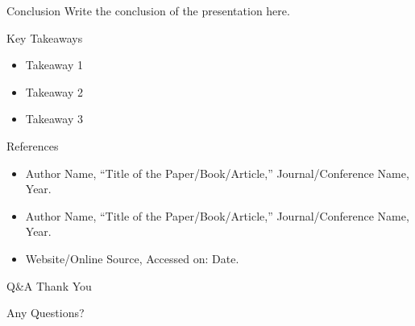 \documentclass{beamer}
\begin{document}
\begin{frame}{Conclusion}
Write the conclusion of the presentation here.

\vspace{0.4cm}

\begin{block}{Key Takeaways}
\begin{itemize}
\item Takeaway 1
\item Takeaway 2
\item Takeaway 3
\end{itemize}
\end{block}
\end{frame}

\begin{frame}[allowframebreaks]{References}
\begin{itemize}
\item Author Name, ``Title of the Paper/Book/Article,'' Journal/Conference Name, Year.
\item Author Name, ``Title of the Paper/Book/Article,'' Journal/Conference Name, Year.
\item Website/Online Source, Accessed on: Date.
\end{itemize}
\end{frame}

\begin{frame}{Q\&A}
\centering
\Huge Thank You

\vspace{0.6cm}

\Large Any Questions?
\end{frame}
\end{document}
